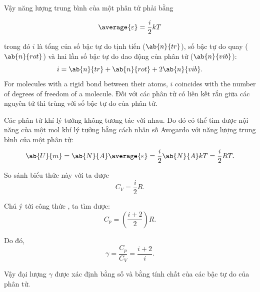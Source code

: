 Vậy năng lượng trung bình của một phân tử phải bằng

\begin{equation}\label{eq:11_34}
	\average{\varepsilon} = \frac{i}{2}kT
\end{equation}

\noindent

trong đó $i$ là tổng của số bậc tự do tịnh tiến ($\ab{n}{tr}$), số bậc tự do quay ($\ab{n}{rot}$) và hai lần số bậc tự do dao động của phân tử ($\ab{n}{vib}$):
\vspace{5pt}
\begin{equation}\label{eq:11_35}
	i = \ab{n}{tr} + \ab{n}{rot} + 2\ab{n}{vib}.
\end{equation}
\noindent
For molecules with a rigid bond between their atoms, $i$ coincides with the number of degrees of freedom of a molecule.
Đối với các phân tử có liên kết rắn giữa các nguyên tử thì trùng với số bậc tự do của phân tử.

Các phân tử khí lý tưởng không tương tác với nhau. Do đó có thể tìm được nội năng của một mol khí lý tưởng bằng cách nhân số Avogardo với năng lượng trung bình của một phân tử:
\begin{equation}\label{eq:11_36}
	\ab{U}{m} = \ab{N}{A}\average{\varepsilon} = \frac{i}{2}\ab{N}{A} kT = \frac{i}{2}RT.
\end{equation}

\noindent
So sánh biểu thức này với  ta được 
\begin{equation}\label{eq:11_37}
	C_V = \frac{i}{2}R.
\end{equation}

\noindent
Chú ý tới công thức , ta tìm được:
\begin{equation}\label{eq:11_38}
	C_p = \left(\frac{i+2}{2}\right) R.
\end{equation}

\noindent
Do đó,
\begin{equation}\label{eq:11_39}
	\gamma = \frac{C_p}{C_V} = \frac{i+2}{i}.
\end{equation}

\noindent
Vậy đại lượng $\gamma$ được xác định bằng số và bằng tính chất của các bậc tự do của phân tử.

